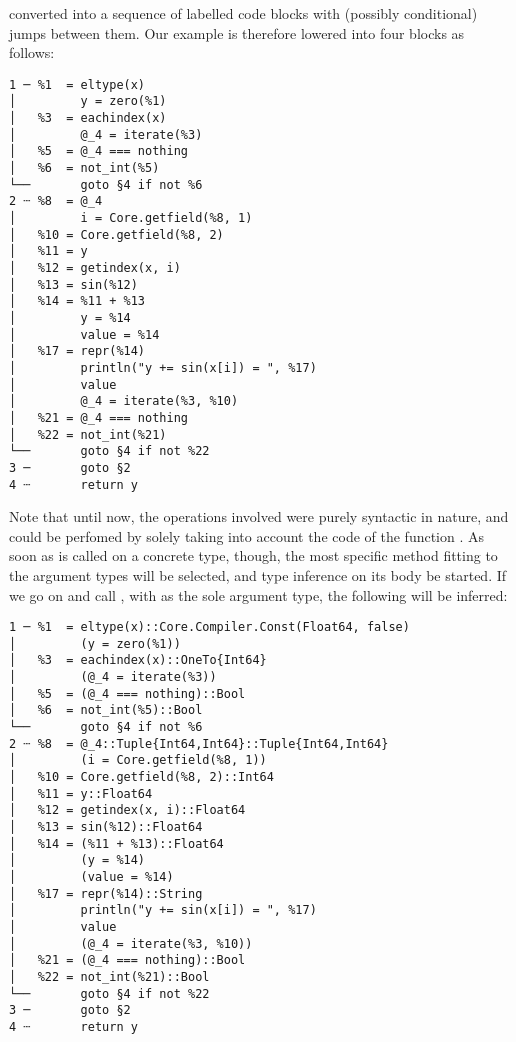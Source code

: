 converted into a sequence of labelled code blocks with (possibly conditional) jumps between
them. Our example is therefore lowered into four blocks as follows:
\begin{lstlisting}
1 ─ %1  = eltype(x)
│         y = zero(%1)
│   %3  = eachindex(x)
│         @_4 = iterate(%3)
│   %5  = @_4 === nothing
│   %6  = not_int(%5)
└──       goto §4 if not %6
2 ┄ %8  = @_4
│         i = Core.getfield(%8, 1)
│   %10 = Core.getfield(%8, 2)
│   %11 = y
│   %12 = getindex(x, i)
│   %13 = sin(%12)
│   %14 = %11 + %13
│         y = %14
│         value = %14
│   %17 = repr(%14)
│         println("y += sin(x[i]) = ", %17)
│         value
│         @_4 = iterate(%3, %10)
│   %21 = @_4 === nothing
│   %22 = not_int(%21)
└──       goto §4 if not %22
3 ─       goto §2
4 ┄       return y
\end{lstlisting}
Note that until now, the operations involved were purely syntactic in nature, and could be perfomed
by solely taking into account the code of the function .  As soon as  is
called on a concrete type, though, the most specific method fitting to the argument types will be
selected, and type inference on its body be started.  If we go on and call , with
 as the sole argument type, the following will be inferred:
\begin{lstlisting}
1 ─ %1  = eltype(x)::Core.Compiler.Const(Float64, false)
│         (y = zero(%1))
│   %3  = eachindex(x)::OneTo{Int64}
│         (@_4 = iterate(%3))
│   %5  = (@_4 === nothing)::Bool
│   %6  = not_int(%5)::Bool
└──       goto §4 if not %6
2 ┄ %8  = @_4::Tuple{Int64,Int64}::Tuple{Int64,Int64}
│         (i = Core.getfield(%8, 1))
│   %10 = Core.getfield(%8, 2)::Int64
│   %11 = y::Float64
│   %12 = getindex(x, i)::Float64
│   %13 = sin(%12)::Float64
│   %14 = (%11 + %13)::Float64
│         (y = %14)
│         (value = %14)
│   %17 = repr(%14)::String
│         println("y += sin(x[i]) = ", %17)
│         value
│         (@_4 = iterate(%3, %10))
│   %21 = (@_4 === nothing)::Bool
│   %22 = not_int(%21)::Bool
└──       goto §4 if not %22
3 ─       goto §2
4 ┄       return y
\end{lstlisting}



